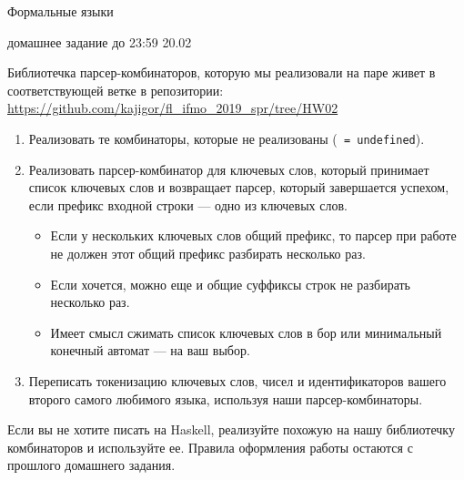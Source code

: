 \documentclass{article}
\begin{document}
\begin{center} {\LARGE Формальные языки} \end{center}

\begin{center} {\Large домашнее задание до 23:59 20.02} \end{center}
\bigskip

Библиотечка парсер-комбинаторов, которую мы реализовали на паре живет в соответствующей ветке в репозитории: \href{https://github.com/kajigor/fl_ifmo_2019_spr/tree/HW02}{https://github.com/kajigor/fl\_ifmo\_2019\_spr/tree/HW02}

\begin{enumerate}
  \item 
  {
    Реализовать те комбинаторы, которые не реализованы (\verb! = undefined!).
  }
  \item
  {
    Реализовать парсер-комбинатор для ключевых слов, который принимает список ключевых слов и возвращает парсер, который завершается успехом, если префикс входной строки --- одно из ключевых слов. 
    
    \begin{itemize}
        \item Если у нескольких ключевых слов общий префикс, то парсер при работе не должен этот общий префикс разбирать несколько раз.
        \item Если хочется, можно еще и общие суффиксы строк не разбирать несколько раз. 
        \item Имеет смысл сжимать список ключевых слов в бор или минимальный конечный автомат --- на ваш выбор.
    \end{itemize}
  }
  \item
  {
    Переписать токенизацию ключевых слов, чисел и идентификаторов вашего второго самого любимого языка, используя наши парсер-комбинаторы.
  }
\end{enumerate}


    Если вы не хотите писать на Haskell, реализуйте похожую на нашу библиотечку комбинаторов и используйте ее. Правила оформления работы остаются с прошлого домашнего задания.
\end{document}
